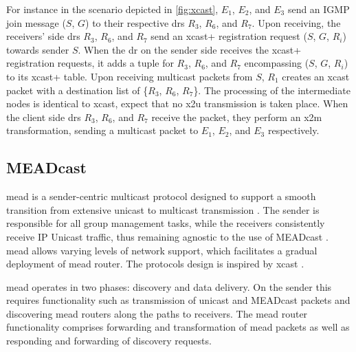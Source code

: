 For instance in the scenario depicted in \autoref{fig:xcast}, $E_1$, $E_2$, and
    $E_3$ send an IGMP join message ($S$, $G$) to their respective \glspl{dr}
    $R_3$, $R_6$, and $R_7$.
Upon receiving, the receivers' side \glspl{dr} $R_3$, $R_6$, and $R_7$ send an
    \gls{xcast+} registration request ($S$, $G$, $R_i$) towards sender $S$.
When the \gls{dr} on the sender side receives the \gls{xcast+} registration
    requests, it adds a tuple for $R_3$, $R_6$, and $R_7$ encompassing ($S$,
    $G$, $R_i$) to its \gls{xcast+} table.
Upon receiving multicast packets from $S$, $R_1$ creates an \gls{xcast} packet
    with a destination list of \{$R_3$, $R_6$, $R_7$\}.
The processing of the intermediate nodes is identical to \gls{xcast}, expect 
    that no \gls{x2u} transmission is taken place.
When the client side \glspl{dr} $R_3$, $R_6$, and $R_7$ receive the packet, 
    they perform an \gls{x2m} transformation, sending a multicast packet to
    $E_1$, $E_2$, and $E_3$ respectively.


\subsection{MEADcast} %
\label{sub:MEADcast}
\gls{mead} is a sender-centric multicast protocol designed to support a smooth
    transition from extensive unicast to multicast transmission
    \cite{meadcast2}.
The sender is responsible for all group management tasks, while the receivers
    consistently receive IP Unicast traffic, thus remaining agnostic to the use
    of MEADcast \cite{meadcast1}.
\gls{mead} allows varying levels of network support, which facilitates a
    gradual deployment of \gls{mead} router.
The protocols design is inspired by \gls{xcast} \cite{meadcast1}.

\gls{mead} operates in two phases: discovery and data delivery.
On the sender this requires functionality such as transmission of unicast and
    MEADcast packets and discovering \gls{mead} routers along the paths to
    receivers.
The \gls{mead} router functionality comprises forwarding and transformation
    of \gls{mead} packets as well as responding and forwarding of discovery
    requests.

